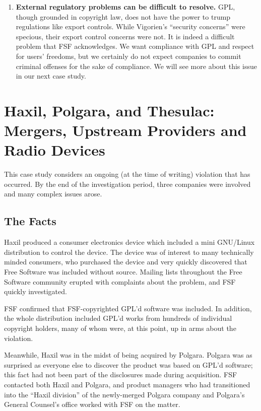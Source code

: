 \documentclass[12pt]{report}
\begin{document}
\begin{enumerate}
\item {\bf External regulatory problems can be difficult to resolve.}
  GPL, though grounded in copyright law, does not have the power to trump
  regulations like export controls.  While Vigorien's ``security
  concerns'' were specious, their export control concerns were not.  It is
  indeed a difficult problem that FSF acknowledges.  We want compliance
  with GPL and respect for users' freedoms, but we certainly do not expect
  companies to commit criminal offenses for the sake of compliance.  We
  will see more about this issue in our next case study.
\end{enumerate}


\chapter{Haxil, Polgara, and Thesulac: Mergers, Upstream Providers and Radio Devices}

This case study considers an ongoing (at the time of writing) violation
that has occurred.  By the end of the investigation period, three
companies were involved and many complex issues arose.

\section{The Facts}

Haxil produced a consumer electronics device which included a mini
GNU/Linux distribution to control the device.  The device was of interest
to many technically minded consumers, who purchased the device and very
quickly discovered that Free Software was included without source.
Mailing lists throughout the Free Software community erupted with
complaints about the problem, and FSF quickly investigated.

FSF confirmed that FSF-copyrighted GPL'd software was included.  In
addition, the whole distribution included GPL'd works from hundreds of
individual copyright holders, many of whom were, at this point, up in
arms about the violation.

Meanwhile, Haxil was in the midst of being acquired by Polgara.  Polgara
was as surprised as everyone else to discover the product was based on
GPL'd software; this fact had not been part of the disclosures made during
acquisition.  FSF contacted both Haxil and Polgara, and product managers
who had transitioned into the ``Haxil division'' of the newly-merged
Polgara company and Polgara's General Counsel's office worked with FSF on
the matter.
\end{document}
